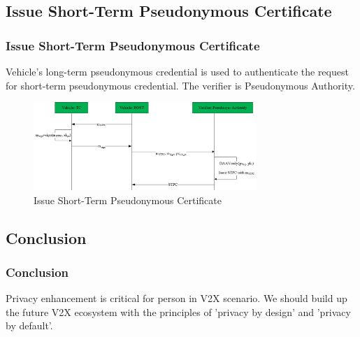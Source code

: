 \documentclass{ctexbeamer}
\begin{document}
\subsection{Issue Short-Term Pseudonymous Certificate}
\begin{frame}
\frametitle{Issue Short-Term Pseudonymous Certificate}

Vehicle’s long-term pseudonymous credential is used to authenticate the request for short-term pseudonymous credential.
\newline
\newline
The verifier is Pseudonymous Authority.

    \begin{figure}[H]
        \centering 
        \includegraphics[width=0.75\textwidth]{pic/ltc.detail.png} 
        \caption{Issue Short-Term Pseudonymous Certificate} 
        \label{fig.ltc.detail}
    \end{figure}
\end{frame}

\subsection{Conclusion}
\begin{frame}
\frametitle{Conclusion}

Privacy enhancement is critical for person in V2X scenario.
\newline
\newline
We should build up the future V2X ecosystem with the principles of 'privacy by design' and 'privacy by default'.
\newline
\newline

\end{frame}



\end{document}
